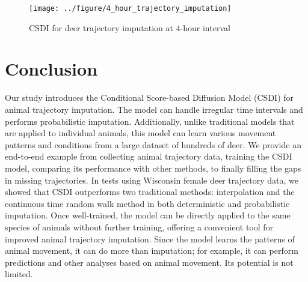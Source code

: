 \documentclass[11pt]{article}
\begin{document}
\begin{figure}[h]
  \centering
  \texttt{[image: ../figure/4\_hour\_trajectory\_imputation]} %
  \caption{CSDI for deer trajectory imputation at 4-hour interval}
  \label{fig: csdi_aug} %
\end{figure}



\section{Conclusion}
Our study introduces the Conditional Score-based Diffusion Model (CSDI) for animal trajectory imputation. The model can handle irregular time intervals and performs probabilistic imputation. Additionally, unlike traditional models that are applied to individual animals, this model can learn various movement patterns and conditions from a large dataset of hundreds of deer. We provide an end-to-end example from collecting animal trajectory data, training the CSDI model, comparing its performance with other methods, to finally filling the gaps in missing trajectories. In tests using Wisconsin female deer trajectory data, we showed that CSDI outperforms two traditional methods: interpolation and the continuous time random walk method in both deterministic and probabilistic imputation. Once well-trained, the model can be directly applied to the same species of animals without further training, offering a convenient tool for improved animal trajectory imputation. Since the model learns the patterns of animal movement, it can do more than imputation; for example, it can perform predictions and other analyses based on animal movement. Its potential is not limited.




\appendix
\end{document}
